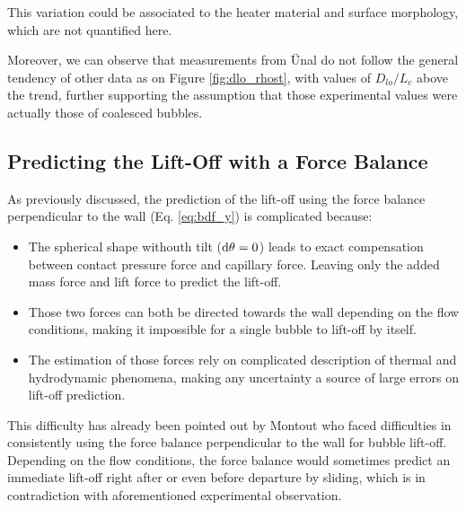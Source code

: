 \begin{remark*}{}
This variation could be associated to the heater material and surface morphology, which are not quantified here.
\end{remark*}

Moreover, we can observe that measurements from \"Unal do not follow the general tendency of other data as on Figure \ref{fig:dlo_rhost}, with values of $D_{lo}/L_{c}$ above the trend, further supporting the assumption that those experimental values were actually those of coalesced bubbles.



\subsection{Predicting the Lift-Off with a Force Balance}

As previously discussed, the prediction of the lift-off using the force balance perpendicular to the wall (Eq. \ref{eq:bdf_y}) is complicated because:

\begin{itemize}
\item The spherical shape withouth tilt ($\mathrm{d}\theta = 0$) leads to exact compensation between contact pressure force and capillary force. Leaving only the added mass force and lift force to predict the lift-off.

\item Those two forces can both be directed towards the wall depending on the flow conditions, making it impossible for a single bubble to lift-off by itself.

\item The estimation of those forces rely on complicated description of thermal and hydrodynamic phenomena, making any uncertainty a source of large errors on lift-off prediction.
\end{itemize}

This difficulty has already been pointed out by Montout \cite{montout_contribution_2009} who faced difficulties in consistently using the force balance perpendicular to the wall for bubble lift-off. Depending on the flow conditions, the force balance would sometimes predict an immediate lift-off right after or even before departure by sliding, which is in contradiction with aforementioned experimental observation.

\npar


